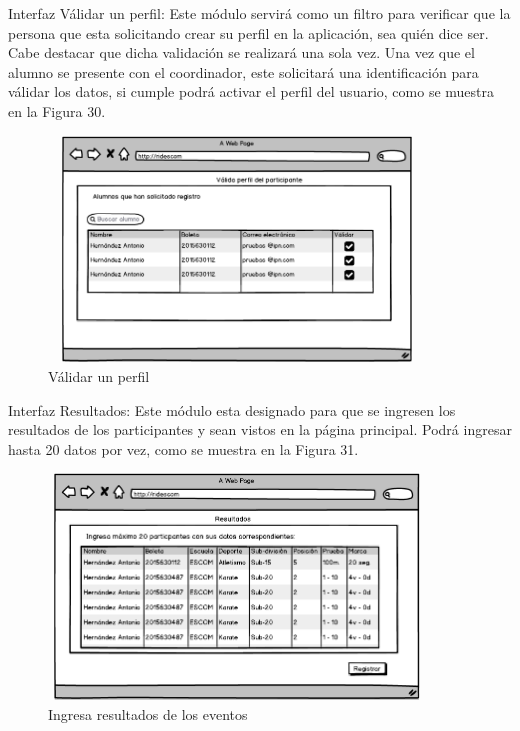 	Interfaz Válidar un perfil: Este módulo servirá como un filtro para verificar que la persona que esta solicitando crear su perfil en la aplicación, sea quién dice ser. Cabe destacar que dicha validación se realizará una sola vez. Una vez que el alumno se presente con el coordinador, este solicitará una identificación para válidar los datos, si cumple podrá activar el perfil del usuario, como se muestra en la Figura 30.
	\begin{figure}[hbt!]
		\centering
		\includegraphics[width=10cm, height=6cm]{Imagenes/Disenos/Validaperfil.png}
		\caption{Válidar un perfil}
	\end{figure}
	\pagebreak
	
	Interfaz Resultados: Este módulo esta designado para que se ingresen los resultados de los participantes y sean vistos en la página principal. Podrá ingresar hasta 20 datos por vez, como se muestra en la Figura 31.
	\begin{figure}[hbt!]
		\centering
		\includegraphics[width=10cm, height=6cm]{Imagenes/Disenos/Ingresaresultados.png}
		\caption{Ingresa resultados de los eventos}
	\end{figure}
	\pagebreak
	
